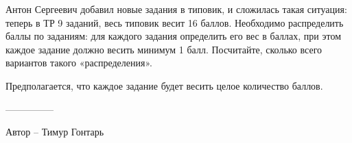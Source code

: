 \question
Антон Сергеевич добавил новые задания в типовик, и сложилась такая ситуация: теперь в ТР 9 заданий, весь типовик весит 16 баллов. Необходимо распределить баллы по заданиям: для каждого задания определить его вес в баллах, при этом каждое задание должно весить минимум 1 балл. Посчитайте, сколько всего вариантов такого «распределения».

Предполагается,  что каждое задание будет весить целое количество баллов.

---------------

Автор -- Тимур Гонтарь
